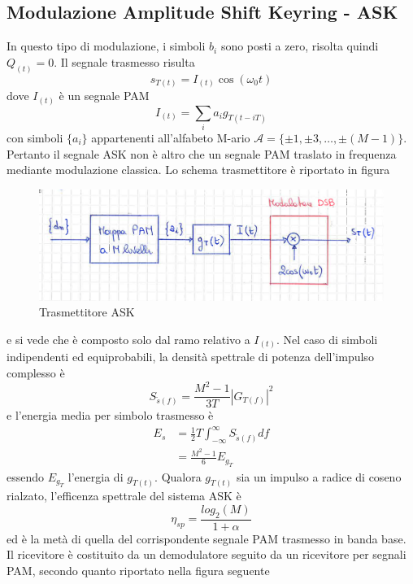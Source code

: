     \subsection{Modulazione Amplitude Shift Keyring - ASK}
        In questo tipo di modulazione, i simboli $b_i$ sono posti a zero, risolta quindi $Q_{(t)} = 0$. 
        Il segnale trasmesso risulta 
        \[
            s_{T(t)} = I_{(t)}\cos(\omega_0 t)
        \]
        dove $I_{(t)}$ è un segnale PAM
        \[
            I_{(t)} = \sum_{i}a_ig_{T(t-iT)}    
        \]
        con simboli $\{a_i\}$ appartenenti all'alfabeto M-ario $\mathcal{A} = \{\pm 1, \pm 3,\dots,\pm (M-1)\}$. Pertanto 
        il segnale ASK non è altro che un segnale PAM traslato in frequenza mediante modulazione classica. Lo schema trasmettitore 
        è riportato in figura 
        \begin{figure}[H]
            \centering
            \includegraphics[width = 12cm]{media/trasmettitore ask.png}
            \caption{Trasmettitore ASK}
        \end{figure}        
        e si vede che è composto solo dal ramo relativo a $I_{(t)}$. Nel caso di simboli indipendenti ed equiprobabili, la densità 
        spettrale di potenza dell'impulso complesso è 
        \[
            S_{\tilde{s}(f)} = \frac{M^2-1}{3T}\left|G_{T(f)}\right|^2
        \]
        e l'energia media per simbolo trasmesso è 
        \begin{align}
            E_s &= \frac{1}{2}T\int_{-\infty}^{\infty}S_{\tilde{s}(f)}df\nonumber \\
                &= \frac{M^2-1}{6}E_{g_T}\nonumber
        \end{align}
        essendo $E_{g_T}$ l'energia di $g_{T(t)}$. Qualora $g_{T(t)}$ sia un impulso a radice di coseno rialzato, l'efficenza spettrale
        del sistema ASK è 
        \[
            \eta_{sp} = \frac{log_2(M)}{1+\alpha}    
        \]
        ed è la metà di quella del corrispondente segnale PAM trasmesso in banda base. Il ricevitore è costituito da un demodulatore seguito da 
        un ricevitore per segnali PAM, secondo quanto riportato nella figura seguente
